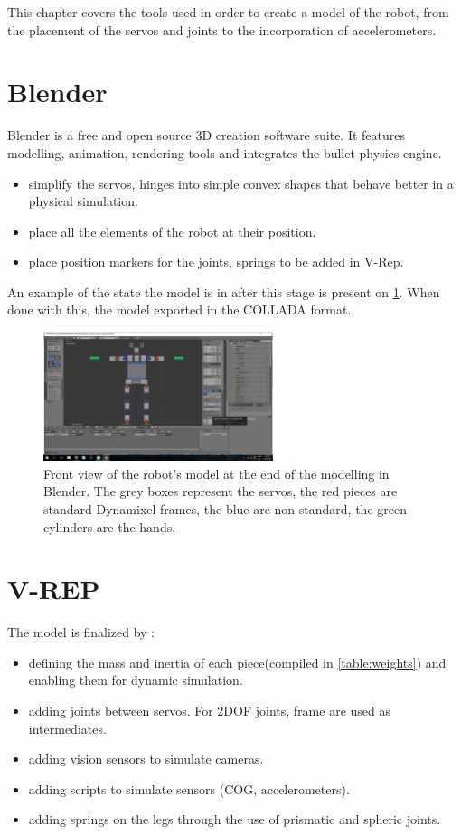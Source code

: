 This chapter covers the tools used in order to create a model of the robot, from the placement of the servos and joints to the incorporation of accelerometers.

\section{Blender}
Blender is a free and open source 3D creation software suite. It features modelling, animation, rendering tools and integrates the bullet physics engine. 

\begin{itemize}
\item simplify the servos, hinges into simple convex shapes that behave better in a physical simulation.
\item place all the elements of the robot at their position.
\item place position markers for the joints, springs to be added in V-Rep.
\end{itemize}
An example of the state the model is in after this stage is present on \cref{fig:modelling_blender}. When done with this, the model exported in the COLLADA format.

\begin{figure}[htp]
\center
\includegraphics[width=0.6\textwidth]{figures/modelling_blender}
\caption[Front view of the robot's model at the end of the modelling in Blender]{Front view of the robot's model at the end of the modelling in Blender. The grey boxes represent the servos, the red pieces are standard Dynamixel frames, the blue are non-standard, the green cylinders are the hands.}
\label{fig:modelling_blender}
\end{figure}

\section{V-REP}
The model is finalized by :
\begin{itemize}
\item defining the mass and inertia of each piece(compiled in \cref{table:weights}) and enabling them for dynamic simulation.
\item adding joints between servos. For 2DOF joints, frame are used as intermediates.
\item adding vision sensors to simulate cameras.
\item adding scripts to simulate sensors (COG, accelerometers).
\item adding springs on the legs through the use of prismatic and spheric joints.
\end{itemize}

